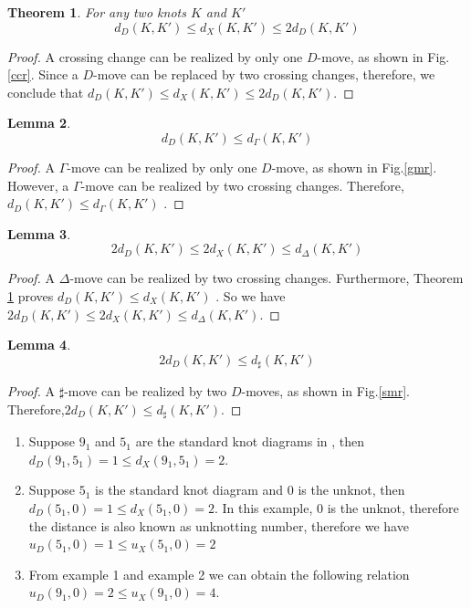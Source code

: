 \documentclass[12pt]{amsart}
\newtheorem{theorem}{Theorem}[section]
\newtheorem{lemma}[theorem]{Lemma}
\theoremstyle{remark}
\begin{document}
\begin{theorem}\label{thd1}
For any two knots $K$ and $K'$ $$d_{D}(K,K') \leq d_{X}(K,K') \leq  2d_{D}(K,K') $$ 
\end{theorem}
\begin{proof}
A crossing change can be realized by only one $D$-move, as shown in Fig.\ref{ccr}. Since a $D$-move can be replaced by two crossing changes, therefore, we conclude that $d_{D}(K,K') \leq d_{X}(K,K') \leq  2d_{D}(K,K') $.
\end{proof}

\begin{lemma}
$$d_{D}(K,K') \leq d_{\Gamma}(K,K')$$
\end{lemma}
\begin{proof}
A $\Gamma$-move can be realized by only one $D$-move, as shown in Fig.\ref{gmr}. However, a $\Gamma$-move can be realized by two crossing changes.  Therefore, $d_{D}(K,K') \leq d_{\Gamma}(K,K')$ .
\end{proof}

\begin{lemma}
$$2d_{D}(K,K') \leq 2d_{X}(K,K')  \leq d_{\Delta}(K,K')$$ 
\end{lemma}

\begin{proof}
A $\Delta$-move can be realized by two crossing changes. Furthermore, Theorem \ref{thd1} proves $d_{D}(K,K') \leq d_{X}(K,K')$ . So we have $2d_{D}(K,K') \leq 2d_{X}(K,K')  \leq d_{\Delta}(K,K')$.
\end{proof}

\begin{lemma}
$$ 2d_{D}(K,K') \leq d_{\sharp}(K,K') $$
\end{lemma}
\begin{proof}
A $\sharp$-move can be realized by two $D$-moves, as shown in Fig.\ref{smr}. Therefore,$ 2d_{D}(K,K') \leq d_{\sharp}(K,K') $.
\end{proof}

\begin{enumerate}
    \item Suppose  $9_1$ and $5_1$ are the standard knot diagrams in \cite{ki}, then $d_{D}(9_1,5_1)=1 \leq d_{X}(9_1,5_1)=2$.
    
    \item Suppose $5_1$ is the standard knot diagram and $0$ is the unknot, then $d_{D}(5_1,0)=1 \leq d_{X}(5_1,0)=2$. In this example, $0$ is the unknot, therefore the distance is also known as unknotting number, therefore we have $u_{D}(5_1,0)=1 \leq u_{X}(5_1,0)=2$
    
    \item From example 1 and example 2 we can obtain the following relation $u_{D}(9_1,0)=2 \leq u_{X}(9_1,0)=4$.
\end{enumerate}
\end{document}
